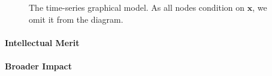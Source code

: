 \documentclass[11pt]{article}
\newcommand{\bx}{\mathbf{x}}
\begin{document}
\begin{figure}[ht]
\label{fig:dgm2}
\caption{The time-series graphical model.
As all nodes condition on $\bx$, we omit it from the diagram.}
\end{figure}

\paragraph{Intellectual Merit}
\paragraph{Broader Impact}




\end{document}
